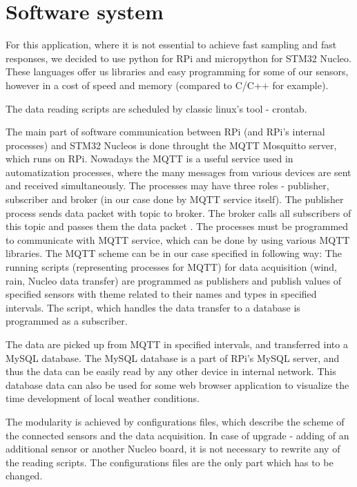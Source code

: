 
\section{Software system}
For this application, where it is not essential to achieve fast sampling and fast responses, we decided to use python for RPi and micropython for STM32 Nucleo. These languages offer us libraries and easy programming for some of our sensors, however in a cost of speed and memory (compared to C/C++ for example).
\par
The data reading scripts are scheduled by classic linux's tool - crontab.


\par
The main part of software communication between RPi (and RPi's internal processes) and STM32 Nucleos is done throught the MQTT Mosquitto server, which runs on RPi. Nowadays the MQTT is a useful service used in automatization processes, where the many messages from various devices are sent and received simultaneously. The processes may have three roles - publisher, subscriber and broker (in our case done by MQTT service itself). The publisher process sends data packet with topic to broker. The broker calls all subscribers of this topic and passes them the data packet \cite{MqttServ}. The processes must be programmed to communicate with MQTT service, which can be done by using various MQTT libraries. The MQTT scheme can be in our case specified in following way: The running scripts (representing processes for MQTT) for data acquisition (wind, rain, Nucleo data transfer) are programmed as publishers and publish values of specified sensors with theme related to their names and types in specified intervals. The script, which handles the data transfer to a database is programmed as a subscriber.


\par
The data are picked up from MQTT in specified intervals, and transferred into a MySQL database. The MySQL database is a part of RPi's MySQL server, and thus the data can be easily read by any other device in internal network. This database data can also be used for some web browser application to visualize the time development of local weather conditions.

\par
The modularity is achieved by configurations files, which describe the scheme of the connected sensors and the data acquisition. In case of upgrade - adding of an additional sensor or another Nucleo board, it is not necessary to rewrite any of the reading scripts. The configurations files are the only part which has to be changed.

